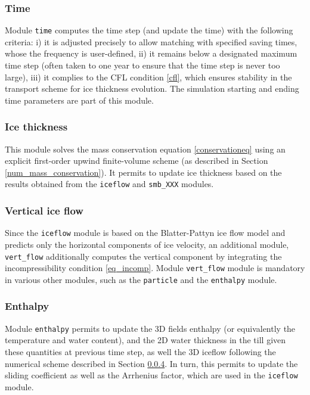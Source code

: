 \documentclass[gmd]{copernicus}
\begin{document}
\subsubsection{Time}
\label{module_time}

Module \texttt{time} computes the time step (and update the time) with the following criteria: i) it is adjusted precisely to allow matching with specified saving times, whose the frequency is user-defined, ii) it remains below a designated maximum time step (often taken to one year to ensure that the time step is never too large), iii) it complies to the CFL condition \eqref{cfl}, which ensures stability in the transport scheme for ice thickness evolution. The simulation starting and ending time parameters are part of this module.

\subsubsection{Ice thickness}
\label{module_thk}

This module solves the mass conservation equation \eqref{conservationeq} using an explicit first-order upwind finite-volume scheme (as described in Section \ref{num_mass_conservation}). It permits to update ice thickness based on the results obtained from the \texttt{iceflow} and \texttt{smb\_XXX} modules. 

\subsubsection{Vertical ice flow}
\label{module_vertical}

Since the \texttt{iceflow} module is based on the Blatter-Pattyn ice flow model and predicts only the horizontal components of ice velocity, an additional module, \texttt{vert\_flow} additionally computes the vertical component by integrating the incompressibility condition \eqref{eq_incomp}. Module \texttt{vert\_flow} module is mandatory in various other modules, such as the \texttt{particle} and the \texttt{enthalpy} module.

\subsubsection{Enthalpy}
\label{module_enthalpy}

Module \texttt{enthalpy} permits to update the 3D fields enthalpy (or equivalently the temperature and water content), and the 2D water thickness in the till given these quantities at previous time step, as well the 3D iceflow following the numerical scheme described in Section \ref{module_enthalpy}. In turn, this permits to update the sliding coefficient as well as the Arrhenius factor, which are used in the \texttt{iceflow} module.
\end{document}
